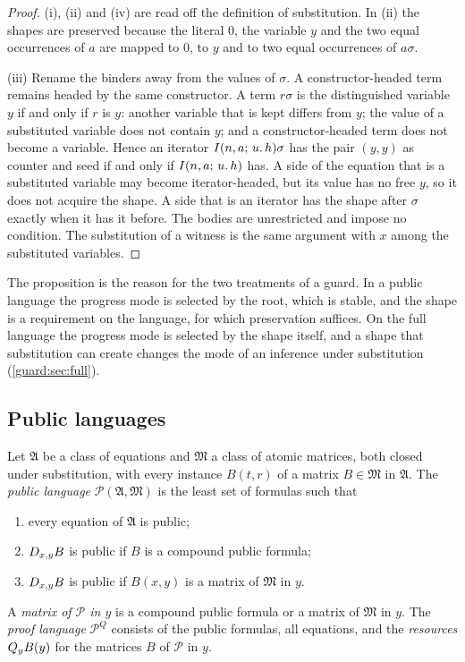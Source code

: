 \begin{proof}
(i), (ii) and (iv) are read off the definition of substitution.  In (ii) the
shapes are preserved because the literal $0$, the variable $y$ and the two
equal occurrences of $a$ are mapped to $0$, to $y$ and to two equal
occurrences of $a\sigma$.

(iii) Rename the binders away from the values of $\sigma$.  A
constructor-headed term remains headed by the same constructor.  A term
$r\sigma$ is the distinguished variable $y$ if and only if $r$ is $y$:
another variable that is kept differs from $y$; the value of a substituted
variable does not contain $y$; and a constructor-headed term does not become
a variable.  Hence an iterator $I(n,a;\,u.\,h)\sigma$ has the pair $(y,y)$
as counter and seed if and only if $I(n,a;\,u.\,h)$ has.  A side of the
equation that is a substituted variable may become iterator-headed, but its
value has no free $y$, so it does not acquire the shape.  A side that is an
iterator has the shape after $\sigma$ exactly when it has it before.  The
bodies are unrestricted and impose no condition.  The substitution of a
witness is the same argument with $x$ among the substituted variables.
\end{proof}

The proposition is the reason for the two treatments of a guard.  In a
public language the progress mode is selected by the root, which is stable,
and the shape is a requirement on the language, for which preservation
suffices.  On the full language the progress mode is selected by the shape
itself, and a shape that substitution can create changes the mode of an
inference under substitution (\cref{guard:sec:full}).

\subsection{Public languages}

\begin{definition}
\label{guard:def:public}
Let $\mathfrak A$ be a class of equations and $\mathfrak M$ a class of
atomic matrices, both closed under substitution, with every instance
$B(t,r)$ of a matrix $B\in\mathfrak M$ in $\mathfrak A$.  The \emph{public
language} $\mathcal P(\mathfrak A,\mathfrak M)$ is the least set of
formulas such that
\begin{enumerate}[label=\textup{(\arabic*)}]
\item every equation of $\mathfrak A$ is public;
\item $D_{x,y}B$ is public if $B$ is a compound public formula;
\item $D_{x,y}B$ is public if $B(x,y)$ is a matrix of $\mathfrak M$ in $y$.
\end{enumerate}
A \emph{matrix of $\mathcal P$ in $y$} is a compound public formula or a
matrix of $\mathfrak M$ in $y$.  The \emph{proof language}
$\mathcal P^{Q}$ consists of the public formulas, all equations, and the
\emph{resources} $Q_{y}B(y)$ for the matrices $B$ of $\mathcal P$ in $y$.
\end{definition}

